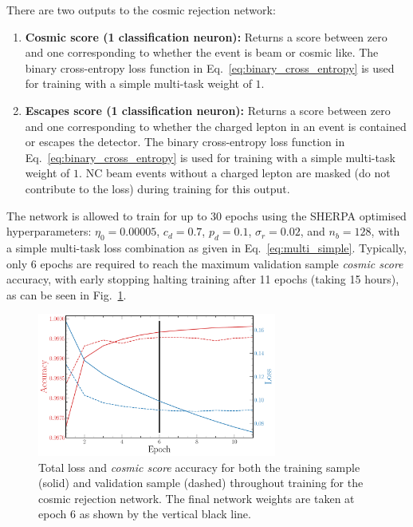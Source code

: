 There are two outputs to the cosmic rejection network:
\begin{enumerate}
    \item \textbf{Cosmic score (1 classification neuron):} Returns a score between zero and one
          corresponding to whether the event is beam or cosmic like. The binary cross-entropy loss
          function in Eq.~\ref{eq:binary_cross_entropy} is used for training with a simple
          multi-task weight of $1$.
    \item \textbf{Escapes score (1 classification neuron):} Returns a score between zero and one
          corresponding to whether the charged lepton in an event is contained or escapes the
          detector. The binary cross-entropy loss function in Eq.~\ref{eq:binary_cross_entropy} is
          used for training with a simple multi-task weight of $1$. NC beam events without a
          charged lepton are masked (do not contribute to the loss) during training for this
          output.
\end{enumerate}

The network is allowed to train for up to 30 epochs using the SHERPA optimised hyperparameters:
$\eta_{0}=0.00005$, $c_{d}=0.7$, $p_{d}=0.1$, $\sigma_{r}=0.02$, and $n_{b}=128$, with a simple
multi-task loss combination as given in Eq.~\ref{eq:multi_simple}. Typically, only 6 epochs are
required to reach the maximum validation sample \emph{cosmic score} accuracy, with early stopping
halting training after 11 epochs (taking 15 hours), as can be seen in
Fig.~\ref{fig:final_cosmic_history}.

\begin{figure} %
    \includegraphics[width=0.7\textwidth]{diagrams/7-results/final_cosmic_history.pdf}
    \caption[Loss and accuracy throughout training for the cosmic rejection network]
    {Total loss and \emph{cosmic score} accuracy for both the training sample (solid) and
        validation sample (dashed) throughout training for the cosmic rejection network. The final
        network weights are taken at epoch 6 as shown by the vertical black line.}
    \label{fig:final_cosmic_history}
\end{figure}

